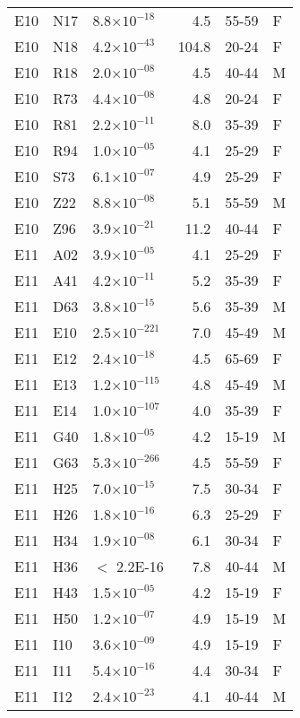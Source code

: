 \begin{longtable}{lllrll}
   E10 & N17 & 8.8$\times10^{-18}$ & 4.5 & 55-59 & F \\ 
   E10 & N18 & 4.2$\times10^{-43}$ & 104.8 & 20-24 & F \\ 
   E10 & R18 & 2.0$\times10^{-08}$ & 4.5 & 40-44 & M \\ 
   E10 & R73 & 4.4$\times10^{-08}$ & 4.8 & 20-24 & F \\ 
   E10 & R81 & 2.2$\times10^{-11}$ & 8.0 & 35-39 & F \\ 
   E10 & R94 & 1.0$\times10^{-05}$ & 4.1 & 25-29 & F \\ 
   E10 & S73 & 6.1$\times10^{-07}$ & 4.9 & 25-29 & F \\ 
   E10 & Z22 & 8.8$\times10^{-08}$ & 5.1 & 55-59 & M \\ 
   E10 & Z96 & 3.9$\times10^{-21}$ & 11.2 & 40-44 & F \\ 
   E11 & A02 & 3.9$\times10^{-05}$ & 4.1 & 25-29 & F \\ 
   E11 & A41 & 4.2$\times10^{-11}$ & 5.2 & 35-39 & F \\ 
   E11 & D63 & 3.8$\times10^{-15}$ & 5.6 & 35-39 & M \\ 
   E11 & E10 & 2.5$\times10^{-221}$ & 7.0 & 45-49 & M \\ 
   E11 & E12 & 2.4$\times10^{-18}$ & 4.5 & 65-69 & F \\ 
   E11 & E13 & 1.2$\times10^{-115}$ & 4.8 & 45-49 & M \\ 
   E11 & E14 & 1.0$\times10^{-107}$ & 4.0 & 35-39 & F \\ 
   E11 & G40 & 1.8$\times10^{-05}$ & 4.2 & 15-19 & M \\ 
   E11 & G63 & 5.3$\times10^{-266}$ & 4.5 & 55-59 & F \\ 
   E11 & H25 & 7.0$\times10^{-15}$ & 7.5 & 30-34 & F \\ 
   E11 & H26 & 1.8$\times10^{-16}$ & 6.3 & 25-29 & F \\ 
   E11 & H34 & 1.9$\times10^{-08}$ & 6.1 & 30-34 & F \\ 
   E11 & H36 & $<$ 2.2E-16 & 7.8 & 40-44 & M \\ 
   E11 & H43 & 1.5$\times10^{-05}$ & 4.2 & 15-19 & F \\ 
   E11 & H50 & 1.2$\times10^{-07}$ & 4.9 & 15-19 & M \\ 
   E11 & I10 & 3.6$\times10^{-09}$ & 4.9 & 15-19 & F \\ 
   E11 & I11 & 5.4$\times10^{-16}$ & 4.4 & 30-34 & F \\ 
   E11 & I12 & 2.4$\times10^{-23}$ & 4.1 & 40-44 & M \\ 

\end{longtable}

